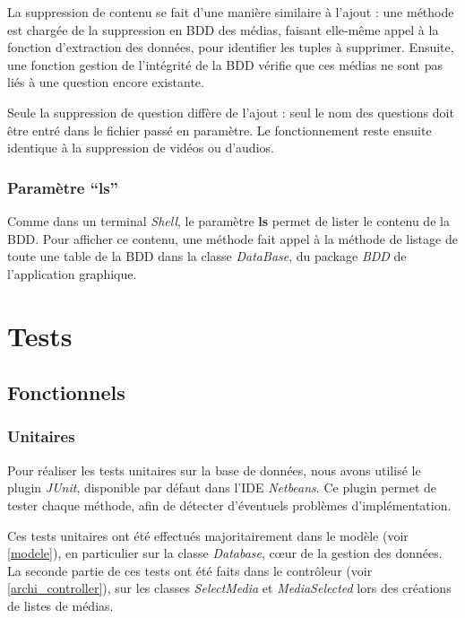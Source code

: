 La suppression de contenu se fait d'une manière similaire à l'ajout : une méthode est chargée de la suppression en BDD des médias, faisant elle-même appel à la fonction d'extraction des données, pour identifier les tuples à supprimer. Ensuite, une fonction gestion de l'intégrité de la BDD vérifie que ces médias ne sont pas liés à une question encore existante.

Seule la suppression de question diffère de l'ajout : seul le nom des questions doit être entré dans le fichier passé en paramètre. Le fonctionnement reste ensuite identique à la suppression de vidéos ou d'audios.

\subsubsection{Paramètre ``ls''}

Comme dans un terminal \textit{Shell}, le paramètre \textbf{ls} permet de lister le contenu de la BDD. Pour afficher ce contenu, une méthode fait appel à la méthode de listage de toute une table de la BDD dans la classe \textit{DataBase}, du package \textit{BDD} de l'application graphique.

\section{Tests}\label{tests}

\subsection{Fonctionnels}

\subsubsection{Unitaires}

Pour réaliser les tests unitaires sur la base de données, nous avons utilisé le plugin \textit{JUnit}, disponible par défaut dans l'IDE \textit{Netbeans}.
Ce plugin permet de tester chaque méthode, afin de détecter d'éventuels problèmes d'implémentation.

Ces tests unitaires ont été effectués majoritairement dans le modèle (voir \ref{modele}), en particulier sur la classe \textit{Database}, cœur de la gestion des données. La seconde partie de ces tests ont été faits dans le contrôleur (voir \ref{archi_controller}), sur les classes \textit{SelectMedia} et \textit{MediaSelected} lors des créations de listes de médias.

